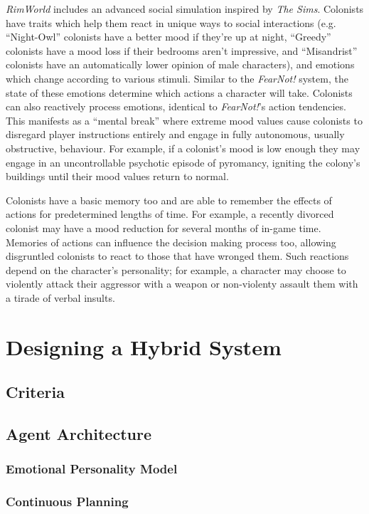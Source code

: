 \documentclass{sig-alternate-05-2015}
\begin{document}
\textit{RimWorld} includes an advanced social simulation inspired by \textit{The Sims}. Colonists have traits which help them react in unique ways to social interactions (e.g. ``Night-Owl'' colonists have a better mood if they're up at night, ``Greedy'' colonists have a mood loss if their bedrooms aren't impressive, and ``Misandrist'' colonists have an automatically lower opinion of male characters), and emotions which change according to various stimuli. Similar to the \textit{FearNot!} system, the state of these emotions determine which actions a character will take. Colonists can also reactively process emotions, identical to \textit{FearNot!}'s action tendencies. This manifests as a ``mental break'' where extreme mood values cause colonists to disregard player instructions entirely and engage in fully autonomous, usually obstructive, behaviour. For example, if a colonist's mood is low enough they may engage in an uncontrollable psychotic episode of pyromancy, igniting the colony's buildings until their mood values return to normal.

Colonists have a basic memory too and are able to remember the effects of actions for predetermined lengths of time. For example, a recently divorced colonist may have a mood reduction for several months of in-game time. Memories of actions can influence the decision making process too, allowing disgruntled colonists to react to those that have wronged them. Such reactions depend on the character's personality; for example, a character may choose to violently attack their aggressor with a weapon or non-violenty assault them with a tirade of verbal insults.

\section{Designing a Hybrid System}
\subsection{Criteria}
\subsection{Agent Architecture}
\subsubsection{Emotional Personality Model}
\subsubsection{Continuous Planning}
\end{document}

